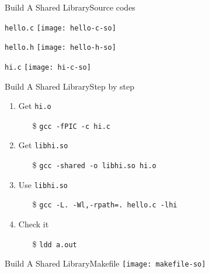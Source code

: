 \begin{frame}{Build A Shared Library}{Source codes}
  \begin{block}{\texttt{hello.c}}
    \texttt{[image: hello-c-so]}
  \end{block}
  \begin{minipage}{.35\linewidth}
    \begin{block}{\texttt{hello.h}}
      \texttt{[image: hello-h-so]}
    \end{block}
  \end{minipage}\qquad
  \begin{minipage}{.36\linewidth}
    \begin{block}{\texttt{hi.c}}
      \texttt{[image: hi-c-so]}
    \end{block}
  \end{minipage}
\end{frame}

\begin{frame}{Build A Shared Library}{Step by step}
  \begin{enumerate}
  \item Get \alert{\texttt{hi.o}}
    \begin{itemize}
    \item[\$] \texttt{gcc -fPIC -c hi.c}
    \end{itemize}
  \item Get \alert{\texttt{libhi.so}}
    \begin{itemize}
    \item[\$] \texttt{gcc -shared -o libhi.so hi.o}
    \end{itemize}
  \item Use \alert{\texttt{libhi.so}}
    \begin{itemize}
    \item[\$] \texttt{gcc -L. -Wl,-rpath=. hello.c -lhi}
    \end{itemize}
  \item Check it
    \begin{itemize}
    \item[\$] \texttt{ldd a.out}
    \end{itemize}
  \end{enumerate}
\end{frame}

\begin{frame}{Build A Shared Library}{Makefile}
  \texttt{[image: makefile-so]}
\end{frame}

